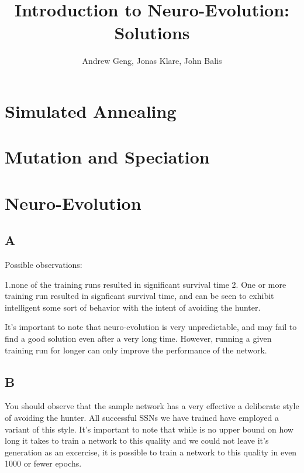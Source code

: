 \documentclass[12]{extarticle}
\begin{document}
\title{Introduction to Neuro-Evolution: Solutions}
\author{Andrew Geng, Jonas Klare, John Balis}




\maketitle





\section{Simulated Annealing}

\subsection{}

\subsection{}

\subsection{}

\section{Mutation and Speciation}


\section{Neuro-Evolution}
\subsection{A}
Possible observations: 

1.none of the training runs resulted in significant survival time
2. One or more training run resulted in signficant survival time, and can be seen to exhibit intelligent some sort of behavior with the intent of avoiding the hunter. 

It's important to note that neuro-evolution is very unpredictable, and may fail to find a good solution even after a very long time. However, running a given training run for longer can only improve the performance of the network.


\subsection{B}
 You should observe that the sample network has a very effective a deliberate style of avoiding the hunter. All successful SSNs we have trained have employed a variant of this style. It's important to note that while is no upper bound on how long it takes to train a network to this quality and we could not leave it's generation as an excercise, it is possible to train a network to this quality in even 1000 or fewer epochs. 
\end{document}
